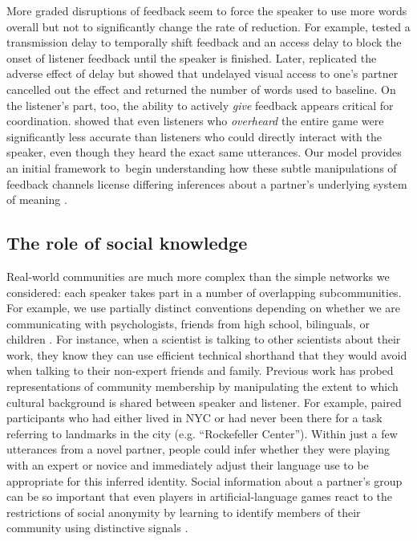 More graded disruptions of feedback seem to force the speaker to use more words overall but not to significantly change the rate of reduction. 
For example,  tested a transmission delay to temporally shift feedback and an access delay to block the onset of listener feedback until the speaker is finished. 
Later,  replicated the adverse effect of delay but showed that undelayed visual access to one's partner cancelled out the effect and returned the number of words used to baseline. 
On the listener's part, too, the ability to actively \emph{give} feedback appears critical for coordination. 
 showed that even listeners who \emph{overheard} the entire game were significantly less accurate than listeners who could directly interact with the speaker, even though they heard the exact same utterances.
Our model provides an initial framework to begin understanding how these subtle manipulations of feedback channels license differing inferences about a partner's underlying system of meaning .

\subsection{The role of social knowledge}

Real-world communities are much more complex than the simple networks we considered: each speaker takes part in a number of overlapping subcommunities. 
For example, we use partially distinct conventions depending on whether we are communicating with psychologists, friends from high school, bilinguals, or children \cite{auer_code-switching_2013}.
For instance, when a scientist is talking to other scientists about their work, they know they can use efficient technical shorthand that they would avoid when talking to their non-expert friends and family. 
Previous work has probed representations of community membership by manipulating the extent to which cultural background is shared between speaker and listener.
For example,  paired participants who had either lived in NYC or had never been there for a task referring to landmarks in the city (e.g. ``Rockefeller Center''). 
Within just a few utterances from a novel partner, people could infer whether they were playing with an expert or novice and immediately adjust their language use to be appropriate for this inferred identity. 
Social information about a partner’s group can be so important that even players in artificial-language games react to the restrictions of social anonymity by learning to identify members of their community using distinctive signals \cite{roberts_experimental_2010}.

